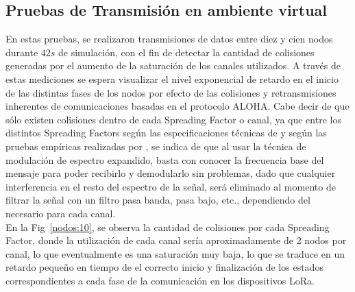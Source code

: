 \begin{justify}
\subsection{Pruebas de Transmisión en ambiente virtual}
En estas pruebas, se realizaron transmisiones de datos entre diez y cien nodos durante $42s$ de simulación, con el fin de detectar la cantidad de colisiones generadas por el aumento de la saturación de los canales utilizados. A través de estas mediciones se espera visualizar el nivel exponencial de retardo en el inicio de las distintas fases de los nodos por efecto de las colisiones y retransmisiones inherentes de comunicaciones basadas en el protocolo ALOHA. Cabe decir de que sólo existen colisiones dentro de cada Spreading Factor o canal, ya que entre los distintos Spreading Factors según las especificaciones técnicas de \cite{Sornin} y según las pruebas empíricas realizadas por \cite{Xavier}, se indica de que al usar la técnica de modulación de espectro expandido, basta con conocer la frecuencia base del mensaje para poder recibirlo y demodularlo sin problemas, dado que cualquier interferencia en el resto del espectro de la señal, será eliminado al momento de filtrar la señal con un filtro pasa banda, pasa bajo, etc., dependiendo del necesario para cada canal.\\
En la Fig~\ref{nodos:10}, se observa la cantidad de colisiones por cada Spreading Factor, donde la utilización de cada canal sería aproximadamente de 2 nodos por canal, lo que eventualmente es una saturación muy baja, lo que se traduce en un retardo pequeño en tiempo de el correcto inicio y finalización de los estados correspondientes a cada fase de la comunicación en los dispositivos LoRa.


\end{justify}
